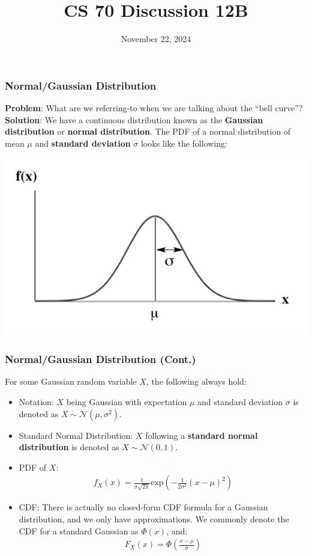 \documentclass{beamer}
\title{CS 70 Discussion 12B}
\date{November 22, 2024}
\begin{document}
\frame{\titlepage}

\begin{frame}
    \frametitle{Normal/Gaussian Distribution}
    {\bf Problem}: What are we referring-to when we are talking about the ``bell curve''?\\
    {\bf Solution}: We have a continuous distribution known as the {\bf Gaussian distribution} or {\bf normal distribution}. The PDF of a normal distribution of mean $\mu$ and {\bf standard deviation} $\sigma$ looks like the following:
    \begin{center}
        \includegraphics[scale=0.5]{Images/normal-distribution.png}
    \end{center}
\end{frame}

\begin{frame}
    \frametitle{Normal/Gaussian Distribution (Cont.)}
    For some Gaussian random variable $X$, the following always hold:
    \begin{itemize}
        \item Notation: $X$ being Gaussian with expectation $\mu$ and standard deviation $\sigma$ is denoted as $X\sim\mathcal{N}(\mu,\sigma^2)$.
        \item Standard Normal Distribution: $X$ following a {\bf standard normal distribution} is denoted as $X\sim\mathcal{N}(0,1)$.
        \item PDF of $X$:
        \begin{align*}
            f_X(x)=\frac{1}{\sigma\sqrt{2\pi}}\text{exp}\left(-\frac{1}{2\sigma^2}(x-\mu)^2\right)
        \end{align*}
        \item CDF: There is actually no closed-form CDF formula for a Gaussian distribution, and we only have approximations. We commonly denote the CDF for a standard Gaussian as $\Phi(x)$, and:
        \begin{align*}
            F_X(x)=\Phi\left(\frac{x-\mu}{\sigma}\right)
        \end{align*}
    \end{itemize}
\end{frame}
\end{document}
